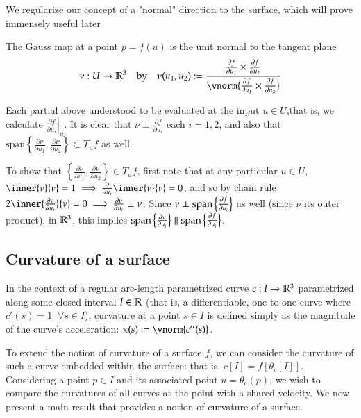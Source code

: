 	  We regularize our concept of a "normal" direction to the surface, which will prove immensely useful later 
	  \begin{defn}
	  The Gauss map at a point $p = f(u)$ is the unit normal to the tangent plane
	  \[\nu : U \to \R^3 \quad\textrm{by}\quad  \nu(u_1, u_2) :=
	  \frac{\frac{\partial f}{\partial u_1} \times \frac{\partial f}{\partial u_2}}
	  {\vnorm{\frac{\partial f}{\partial u_1} \times \frac{\partial f}{\partial u_2}}} \]
	\end{defn}
	  Each partial above understood to be evaluated at the input $u \in U$,that is, we calculate $\left.\frac{\partial f}{\partial u_i}\right|_u$.
	  It is clear that $\nu \perp \frac{\partial f}{\partial u_i}$ each $i=1,2$, and also that
	  $\textrm{span}\left\{ \frac{\partial \nu}{\partial u_1}, \frac{\partial \nu}{\partial u_2}\right\} \subset T_u f$ as well.
	  
	  To show that $\left\{\frac{\partial \nu}{\partial u_1} , \frac{\partial \nu}{\partial u_2}\right\} \in T_u f$,
	  first note that at any particular $u \in U$,
	  $\inner{\nu}{\nu} = 1 \implies \frac{\partial}{\partial u_i} \inner{\nu}{\nu} = 0$,
	  and so by chain rule $2\inner{\frac{\partial \nu}{\partial u_i}}{\nu} = 0
	  \implies \frac{\partial \nu}{\partial u_i} \perp \nu $.
	  Since $ \nu \perp \mathrm{span}\left\{\frac{\partial f}{\partial u_i}\right\} $ as well (since $\nu$ its outer product), in  $\mathbb{R}^3$, this implies
	  $\mathrm{span}\left\{\frac{\partial \nu}{\partial u_i}\right\} \parallel
	  \mathrm{span}\left\{\frac{\partial f}{\partial u_i}\right\}$.
	  
        \subsection{Curvature of a surface}
        In the context of a regular arc-length parametrized curve $c: I \to \mathbb{R}^3$ parametrized along some closed interval $I\in \mathbb{R}$
	        (that is, a differentiable, one-to-one curve where $c'(s) = 1 \;\; \forall s \in I$), curvature at a point $s \in I$ is defined simply as the magnitude of the curve's acceleration: $\kappa(s) := \vnorm{c''(s)}$.
	    
	    To extend the notion of curvature of a surface $f$, we can consider the curvature of such a curve embedded within the surface: that is, $c[I] = f[\theta_c[I]]$. Considering a point $p \in I$ and its associated point $u = \theta_c(p)$, we wish to compare the curvatures of all curves at the point with a shared velocity. We now present a main result that provides a notion of curvature of a surface.
		
